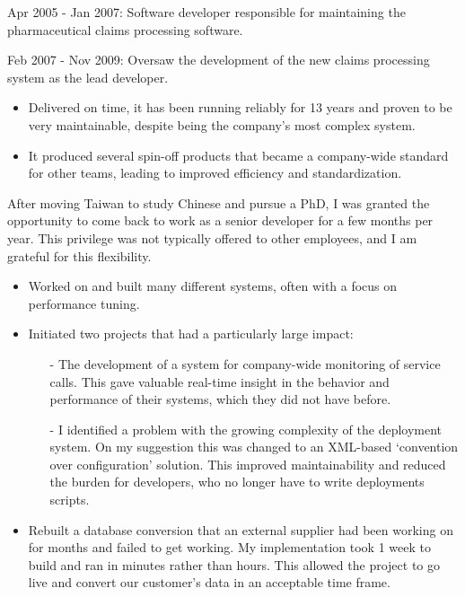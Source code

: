 \documentclass[10pt,a4paper]{../altacv}
\begin{document}
Apr 2005 - Jan 2007: Software developer responsible for maintaining the pharmaceutical claims processing software.

Feb 2007 - Nov 2009: Oversaw the development of the new claims processing system as the lead developer.
\begin{itemize}
	\item\small{Delivered on time, it has been running reliably for 13 years and proven to be very maintainable, despite being the company's most complex system.}
	\item\small{It produced several spin-off products that became a company-wide standard for other teams, leading to improved efficiency and standardization.}
\end{itemize}

\medskip

After moving Taiwan to study Chinese and pursue a PhD, I was granted the opportunity to come back to work as a senior developer for a few months per year. This privilege was not typically offered to other employees, and I am grateful for this flexibility.


\begin{itemize}
	\item\small{Worked on and built many different systems, often with a focus on performance tuning.}
	\item\small{Initiated two projects that had a particularly large impact:
	\begin{itemize}
		\item[-]\small{The development of a system for company-wide monitoring of service calls. This gave valuable real-time insight in the behavior and performance of their systems, which they did not have before.}
		\item[-]\small{I identified a problem with the growing complexity of the deployment system. On my suggestion this was changed to an XML-based ‘convention over configuration' solution. This improved maintainability and reduced the burden for developers, who no longer have to write deployments scripts.}
	\end{itemize}
	}
	\item\small{Rebuilt a database conversion that an external supplier had been working on for months and failed to get working. My implementation took 1 week to build and ran in minutes rather than hours. This allowed the project to go live and convert our customer's data in an acceptable time frame.}
\end{itemize}
\end{document}
